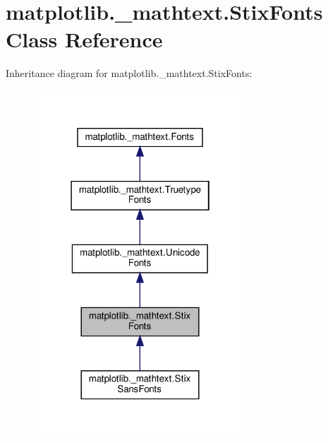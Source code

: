 \hypertarget{classmatplotlib_1_1__mathtext_1_1StixFonts}{}\section{matplotlib.\+\_\+mathtext.\+Stix\+Fonts Class Reference}
\label{classmatplotlib_1_1__mathtext_1_1StixFonts}


Inheritance diagram for matplotlib.\+\_\+mathtext.\+Stix\+Fonts\+:
\nopagebreak
\begin{figure}[H]
\begin{center}
\leavevmode
\includegraphics[width=226pt]{classmatplotlib_1_1__mathtext_1_1StixFonts__inherit__graph}
\end{center}
\end{figure}


